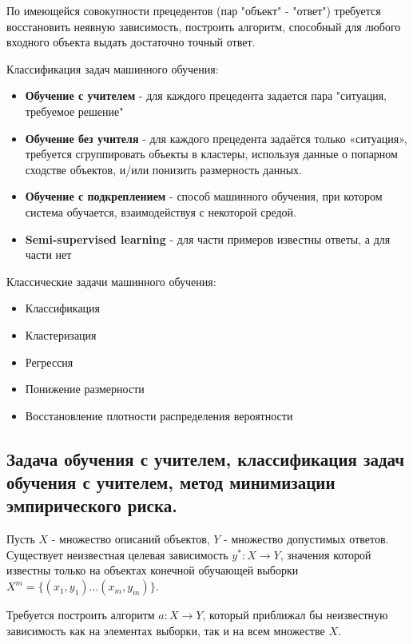 \documentclass{article}
\begin{document}

По имеющейся совокупности прецедентов (пар "объект" - "ответ") требуется
восстановить неявную зависимость, построить алгоритм, способный для любого
входного объекта выдать достаточно точный ответ.

Классификация задач машинного обучения:
\begin{itemize}
    \item \textbf{Обучение с учителем} - для каждого прецедента задается пара "ситуация, требуемое решение"
    \item \textbf{Обучение без учителя} - для каждого прецедента задаётся только
    «ситуация», требуется сгруппировать объекты в кластеры, используя данные
    о попарном сходстве объектов, и/или понизить размерность данных.
    \item \textbf{Обучение с подкреплением} - способ машинного обучения, при котором
    система обучается, взаимодействуя с некоторой средой.
    \item \textbf{Semi-supervised learning} - для части примеров известны ответы, а для части нет
\end{itemize}

Классические задачи машинного обучения:
\begin{itemize}
    \item Классификация
    \item Кластеризация
    \item Регрессия
    \item Понижение размерности
    \item Восстановление плотности распределения вероятности
\end{itemize}

\subsection{Задача обучения с учителем, классификация задач обучения с учителем, метод
минимизации эмпирического риска.}

Пусть $X$ - множество описаний объектов, $Y$ - множество допустимых ответов.
Существует неизвестная целевая зависимость $y^*: X \to Y$, значения которой
известны только на объектах конечной обучающей выборки $X^m = \{(x_1, y_1)\dots (x_m, y_m)\}$.

Требуется построить алгоритм $a: X \to Y$, который приближал бы неизвестную
зависимость как на элементах выборки, так и на всем множестве $X$.
\end{document}

